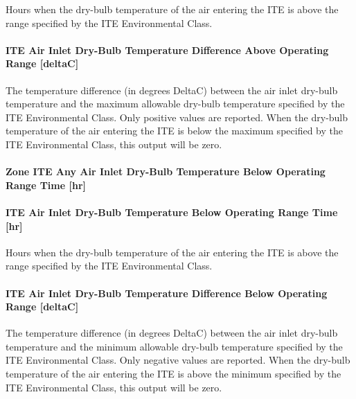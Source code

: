 Hours when the dry-bulb temperature of the air entering the ITE is above the range specified by the ITE Environmental Class.

\paragraph{ITE Air Inlet Dry-Bulb Temperature Difference Above Operating Range {[}deltaC{]}}\label{ite-air-inlet-dry-bulb-temperature-difference-above-operating-range-deltac}

The temperature difference (in degrees DeltaC) between the air inlet dry-bulb temperature and the maximum allowable dry-bulb temperature specified by the ITE Environmental Class. Only positive values are reported. When the dry-bulb temperature of the air entering the ITE is below the maximum specified by the ITE Environmental Class, this output will be zero.

\paragraph{Zone ITE Any Air Inlet Dry-Bulb Temperature Below Operating Range Time {[}hr{]}}\label{zone-ite-any-air-inlet-dry-bulb-temperature-below-operating-range-time-hr}

\paragraph{ITE Air Inlet Dry-Bulb Temperature Below Operating Range Time {[}hr{]}}\label{ite-air-inlet-dry-bulb-temperature-below-operating-range-time-hr}

Hours when the dry-bulb temperature of the air entering the ITE is above the range specified by the ITE Environmental Class.

\paragraph{ITE Air Inlet Dry-Bulb Temperature Difference Below Operating Range {[}deltaC{]}}\label{ite-air-inlet-dry-bulb-temperature-difference-below-operating-range-deltac}

The temperature difference (in degrees DeltaC) between the air inlet dry-bulb temperature and the minimum allowable dry-bulb temperature specified by the ITE Environmental Class. Only negative values are reported. When the dry-bulb temperature of the air entering the ITE is above the minimum specified by the ITE Environmental Class, this output will be zero.

